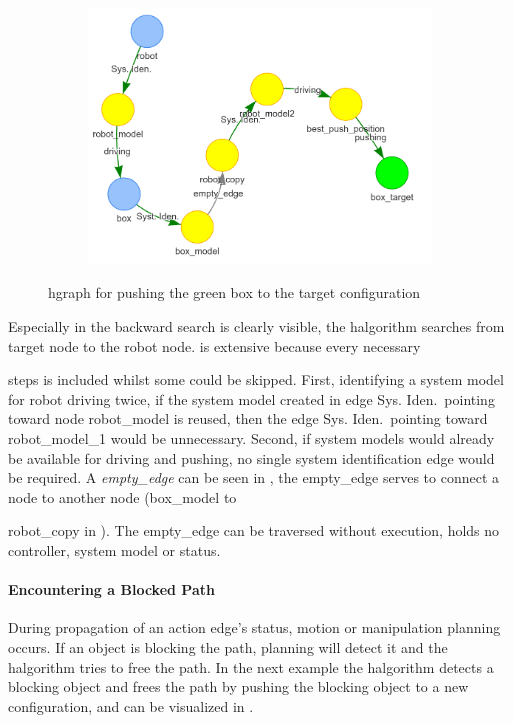 \begin{figure}[H]
\begin{subfigure}{.3\textwidth}
    \includegraphics[width=1.05\textwidth]{figures/proposed_method/connecting_nodes/robot_push/robot_push_9}
    \caption{}\label{subfig:robot_push_9}
    \end{subfigure}
    \caption{\ac{hgraph} for pushing the green box to the target configuration}%
    \label{fig:robot_push_hgraph}
\end{figure}
Especially in  the backward search is clearly visible, the \ac{halgorithm} searches from target node to the robot node.  is extensive because every necessary 

steps is included whilst some could be skipped. First, identifying a system model for robot driving twice, if the system model created in edge Sys. Iden.~pointing toward node robot\_model is reused, then the edge Sys. Iden.~pointing toward robot\_model\_1 would be unnecessary. Second, if system models would already be available for driving and pushing, no single system identification edge would be required. A \textit{empty\_edge} can be seen in , the empty\_edge serves to connect a node to another node (box\_model to 

robot\_copy in ). The empty\_edge can be traversed without execution, holds no controller, system model or status.\bs

\paragraph{Encountering a Blocked Path}%
During propagation of an action edge's status, motion or manipulation planning occurs. If an object is blocking the path, planning will detect it and the \ac{halgorithm} tries to free the path. In the next example the \ac{halgorithm} detects a blocking object and frees the path by pushing the blocking object to a new configuration, and can be visualized in .\bs


